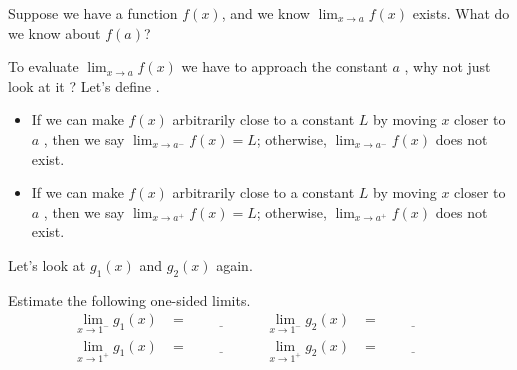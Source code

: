 \documentclass[../main.tex]{subfiles}
\begin{document}
  \faComments{} Suppose we have a function \(f(x)\), and we know \(\lim_{x \to a} f(x)\) exists. What do we know about \(f(a)\)?
  \clearpage

  To evaluate \(\lim_{x \to a} f(x)\) we have to approach the constant \(a\) , why not just look at it ?  Let's define .
  \begin{itemize}
    \item If we can make \(f(x)\) arbitrarily close to a constant \(L\) by moving \(x\) closer to \(a\) , then we say \(\lim_{x \to a^{-}} f(x) = L\); otherwise, \(\lim_{x \to a^{-}} f(x)\) does not exist.
  
    \item If we can make \(f(x)\) arbitrarily close to a constant \(L\) by moving \(x\) closer to \(a\) , then we say \(\lim_{x \to a^{+}} f(x) = L\); otherwise, \(\lim_{x \to a^{+}} f(x)\) does not exist.
  \end{itemize}
  
  \begin{example}
    Let's look at \(g_{1}(x)\) and \(g_{2}(x)\) again.

    \begin{center}
      \hspace{1in}
    \end{center}

    Estimate the following one-sided limits.
    \begin{align*}
      \lim_{x \to 1^{-}} g_{1}(x) 
      &= \underline{\hspace{2cm}}
      & \lim_{x \to 1^{-}} g_{2}(x) 
      &= \underline{\hspace{2cm}} \\[2ex]
      \lim_{x \to 1^{+}} g_{1}(x) 
      &= \underline{\hspace{2cm}}
      & \lim_{x \to 1^{+}} g_{2}(x) 
      &= \underline{\hspace{2cm}}
    \end{align*}
  \end{example}
  
\end{document}

